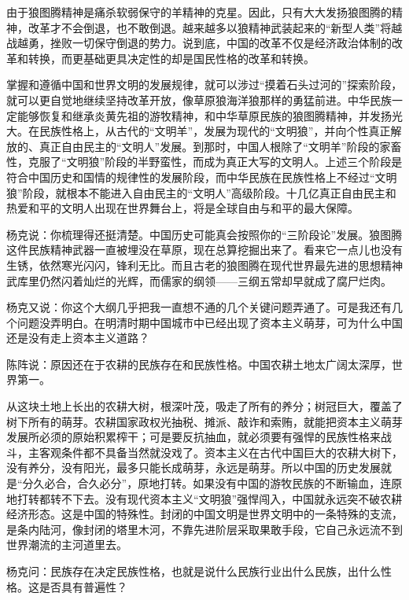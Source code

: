 \par 由于狼图腾精神是痛杀软弱保守的羊精神的克星。因此，只有大大发扬狼图腾的精神，改革才不会倒退，也不敢倒退。越来越多以狼精神武装起来的“新型人类”将越战越勇，挫败一切保守倒退的势力。说到底，中国的改革不仅是经济政治体制的改革和转换，而更基础更具决定性的却是国民性格的改革和转换。
\par 掌握和遵循中国和世界文明的发展规律，就可以涉过“摸着石头过河的”探索阶段，就可以更自觉地继续坚持改革开放，像草原狼海洋狼那样的勇猛前进。中华民族一定能够恢复和继承炎黄先祖的游牧精神，和中华草原民族的狼图腾精神，并发扬光大。在民族性格上，从古代的“文明羊”，发展为现代的“文明狼”，并向个性真正解放的、真正自由民主的“文明人”发展。到那时，中国人根除了“文明羊”阶段的家畜性，克服了“文明狼”阶段的半野蛮性，而成为真正大写的文明人。上述三个阶段是符合中国历史和国情的规律性的发展阶段，而中华民族在民族性格上不经过“文明狼”阶段，就根本不能进入自由民主的“文明人”高级阶段。十几亿真正自由民主和热爱和平的文明人出现在世界舞台上，将是全球自由与和平的最大保障。
\par 
\par 杨克说：你梳理得还挺清楚。中国历史可能真会按照你的“三阶段论”发展。狼图腾这件民族精神武器一直被埋没在草原，现在总算挖掘出来了。看来它一点儿也没有生锈，依然寒光闪闪，锋利无比。而且古老的狼图腾在现代世界最先进的思想精神武库里仍然闪着灿烂的光辉，而儒家的纲领——三纲五常却早就成了腐尸烂肉。
\par 杨克又说：你这个大纲几乎把我一直想不通的几个关键问题弄通了。可是我还有几个问题没弄明白。在明清时期中国城市中已经出现了资本主义萌芽，可为什么中国还是没有走上资本主义道路？
\par 陈阵说：原因还在于农耕的民族存在和民族性格。中国农耕土地太广阔太深厚，世界第一。
\par 从这块土地上长出的农耕大树，根深叶茂，吸走了所有的养分；树冠巨大，覆盖了树下所有的萌芽。农耕国家政权光抽税、摊派、敲诈和索贿，就能把资本主义萌芽发展所必须的原始积累榨干；可是要反抗抽血，就必须要有强悍的民族性格来战斗，主客观条件都不具备当然就没戏了。资本主义在古代中国巨大的农耕大树下，没有养分，没有阳光，最多只能长成萌芽，永远是萌芽。所以中国的历史发展就是“分久必合，合久必分”，原地打转。如果没有中国的游牧民族的不断输血，连原地打转都转不下去。没有现代资本主义“文明狼”强悍闯入，中国就永远突不破农耕经济形态。这是中国的特殊性。封闭的中国文明是世界文明中的一条特殊的支流，是条内陆河，像封闭的塔里木河，不靠先进阶层采取果敢手段，它自己永远流不到世界潮流的主河道里去。
\par 杨克问：民族存在决定民族性格，也就是说什么民族行业出什么民族，出什么性格。这是否具有普遍性？
